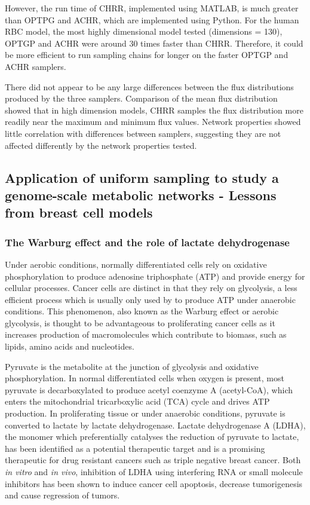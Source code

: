 \documentclass[10pt,letterpaper]{article}
\begin{document}
However, the run time of CHRR, implemented using MATLAB, is much greater than OPTPG and ACHR, which are implemented using Python. For the human RBC model, the most highly dimensional model tested (dimensions = 130), OPTGP and ACHR were around 30 times faster than CHRR. Therefore, it could be more efficient to run sampling chains for longer on the faster OPTGP and ACHR samplers. 

There did not appear to be any large differences between the flux distributions produced by the three samplers. Comparison of the mean flux distribution showed that in high dimension models, CHRR samples the flux distribution more readily near the maximum and minimum flux values. Network properties showed little correlation with differences between samplers, suggesting they are not affected differently by the network properties tested.

\subsection*{Application of uniform sampling to study a genome-scale metabolic networks - Lessons from breast cell models}
\label{cancer}

\subsubsection*{The Warburg effect and the role of lactate dehydrogenase}
Under aerobic conditions, normally differentiated cells rely on oxidative phosphorylation to produce adenosine triphosphate (ATP) and provide energy for cellular processes. Cancer cells are distinct in that they rely on glycolysis, a less efficient process which is usually only used by to produce ATP under anaerobic conditions. This phenomenon, also known as the Warburg effect or aerobic glycolysis, is thought to be advantageous to proliferating cancer cells as it increases production of macromolecules which contribute to biomass, such as lipids, amino acids and nucleotides\cite{Heiden}.

Pyruvate is the metabolite at the junction of glycolysis and oxidative phosphorylation. In normal differentiated cells when oxygen is present, most pyruvate is decarboxylated to produce acetyl coenzyme A (acetyl-CoA), which enters the mitochondrial tricarboxylic acid (TCA) cycle and drives ATP production\cite{Heiden}. In proliferating tissue or under anaerobic conditions, pyruvate is converted to lactate by lactate dehydrogenase. Lactate dehydrogenase A (LDHA), the monomer which preferentially catalyses the reduction of pyruvate to lactate, has been identified as a potential therapeutic target and is a promising therapeutic for drug resistant cancers such as triple negative breast cancer\cite{Allison}\cite{Mack}. Both \textit{in vitro} and \textit{in vivo}, inhibition of LDHA using interfering RNA or small molecule inhibitors has been shown to induce cancer cell apoptosis, decrease tumorigenesis and cause regression of tumors\cite{Allison}\cite{Xie}.
\end{document}
